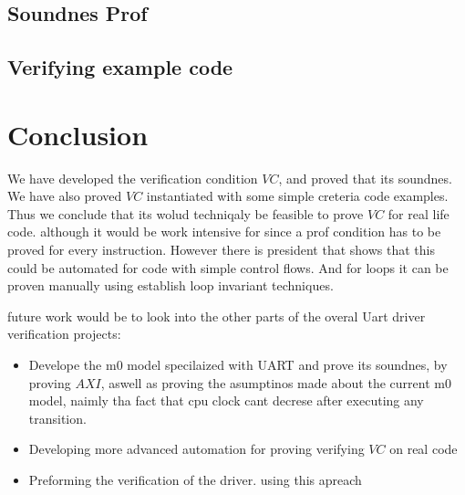 \subsection{Soundnes Prof}
\subsection{Verifying example code}

\section{Conclusion}

We have developed the verification condition $VC$, and proved that its soundnes. We have also proved $VC$ instantiated with some simple creteria code examples. Thus we conclude that its wolud techniqaly be feasible to prove $VC$ for real life code. although it would be work intensive for since a prof condition has to be proved for every instruction. However there is president that shows that this could be automated for code with simple control flows. And for loops it can be proven manually using establish loop invariant techniques.

future work would be to look into the other parts of the overal Uart driver verification projects:
\begin{itemize}
    \item Develope the m0 model specilaized with UART and prove its soundnes, by proving $AXI$, aswell as proving the asumptinos made about the current m0 model, naimly tha fact that cpu clock cant decrese after executing any transition.
    \item Developing more advanced automation for proving verifying $VC$ on real code
    \item Preforming the verification of the driver. using this apreach
\end{itemize}



